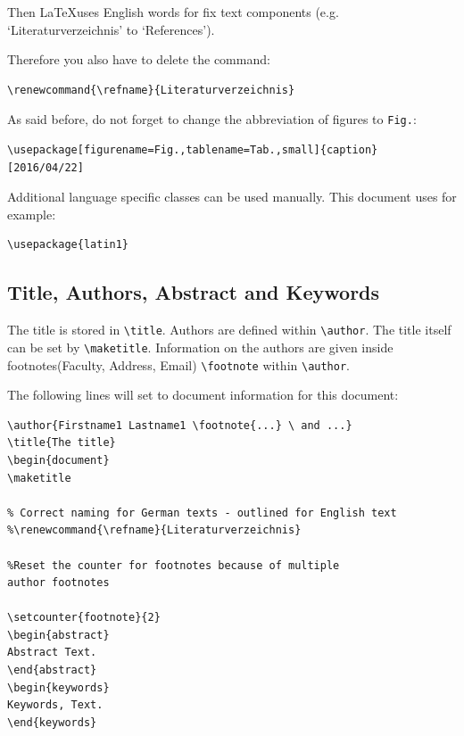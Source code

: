 \documentclass[english]{lni}
\begin{document}
Then \LaTeX uses English words for fix text components (e.g.  `Literaturverzeichnis' to `References').

Therefore you also have to delete the command:
\begin{verbatim}
\renewcommand{\refname}{Literaturverzeichnis}
\end{verbatim}

As said before, do not forget to change the abbreviation of figures to \texttt{Fig.}:
\begin{verbatim}
\usepackage[figurename=Fig.,tablename=Tab.,small]{caption}
[2016/04/22]  
\end{verbatim}

Additional language specific classes can be used manually. This document uses for example:

\begin{verbatim}
\usepackage{latin1}
\end{verbatim}

\subsection{Title, Authors, Abstract and Keywords}

The title is stored in \verb|\title|. Authors are defined within \verb|\author|. The title itself can be set by \verb|\maketitle|. Information on the authors are given inside footnotes(Faculty, Address, Email) \verb|\footnote| within \verb|\author|. 

The following lines will set to document information for this document:

\begin{verbatim}
\author{Firstname1 Lastname1 \footnote{...} \ and ...}
\title{The title}
\begin{document}
\maketitle

% Correct naming for German texts - outlined for English text
%\renewcommand{\refname}{Literaturverzeichnis}

%Reset the counter for footnotes because of multiple 
author footnotes

\setcounter{footnote}{2}
\begin{abstract}
Abstract Text.
\end{abstract}
\begin{keywords}
Keywords, Text.
\end{keywords}
\end{verbatim}
\end{document}
